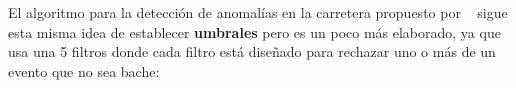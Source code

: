 


		El algoritmo para la detección de anomalías en la carretera propuesto por ~ sigue esta misma idea
		de establecer \textbf{umbrales} pero es un poco más elaborado, ya que usa una 5 filtros donde cada filtro está diseñado para rechazar
		uno o más de un evento que no sea bache:\\

